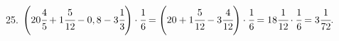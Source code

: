 25. $\left(20\cfrac{4}{5}+1\cfrac{5}{12}-0,8-3\cfrac{1}{3}\right)\cdot\cfrac{1}{6}=
\left(20+1\cfrac{5}{12}-3\cfrac{4}{12}\right)\cdot\cfrac{1}{6}=18\cfrac{1}{12}\cdot\cfrac{1}{6}=3\cfrac{1}{72}.$\\
